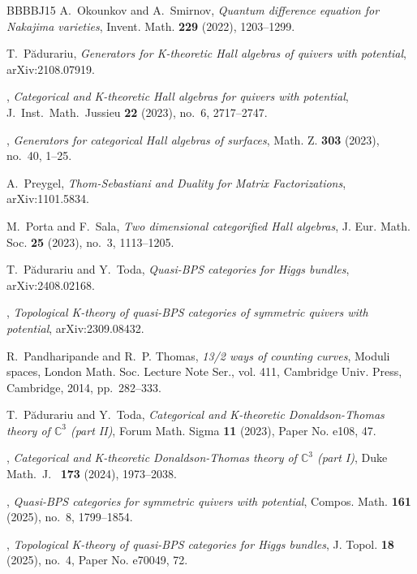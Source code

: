\documentclass [11pt,oneside,a4paper,mathscr]{amsart}
\theoremstyle{definition}
\begin{document}
\begin{thebibliography}{BBBBJ15}
A.~Okounkov and A.~Smirnov, \emph{Quantum difference equation for {N}akajima varieties}, Invent. Math. \textbf{229} (2022), 1203--1299.

T.~P{\u{a}}durariu, \emph{Generators for {K}-theoretic {H}all algebras of quivers with potential}, arXiv:2108.07919.

\bysame, \emph{Categorical and {K}-theoretic {H}all algebras for quivers with potential}, J.~Inst.~Math.~Jussieu \textbf{22} (2023), no.~6, 2717--2747.

\bysame, \emph{Generators for categorical {H}all algebras of surfaces}, Math. Z. \textbf{303} (2023), no.~40, 1--25.

A.~Preygel, \emph{{T}hom-{S}ebastiani and {D}uality for {M}atrix {F}actorizations}, arXiv:1101.5834.

M.~Porta and F.~Sala, \emph{Two dimensional categorified {H}all algebras}, J. Eur. Math. Soc. \textbf{25} (2023), no.~3, 1113--1205.

T.~P\u{a}durariu and Y.~Toda, \emph{Quasi-{BPS} categories for {H}iggs bundles}, arXiv:2408.02168.

\bysame, \emph{Topological {K}-theory of quasi-{BPS} categories of symmetric quivers with potential}, arXiv:2309.08432.

R.~Pandharipande and R.~P. Thomas, \emph{13/2 ways of counting curves}, Moduli spaces, London Math. Soc. Lecture Note Ser., vol. 411, Cambridge Univ. Press, Cambridge, 2014, pp.~282--333.

T.~P\u{a}durariu and Y.~Toda, \emph{Categorical and {K}-theoretic {D}onaldson-{T}homas theory of $\mathbb{C}^3$ (part {II})}, Forum Math. Sigma \textbf{11} (2023), Paper No. e108, 47.

\bysame, \emph{Categorical and {K}-theoretic {D}onaldson-{T}homas theory of $\mathbb{C}^3$ (part {I})}, Duke Math.~J.~ \textbf{173} (2024), 1973--2038.

\bysame, \emph{Quasi-{BPS} categories for symmetric quivers with potential}, Compos. Math. \textbf{161} (2025), no.~8, 1799--1854.

\bysame, \emph{Topological {K}-theory of quasi-{BPS} categories for {H}iggs bundles}, J. Topol. \textbf{18} (2025), no.~4, Paper No. e70049, 72.


\end{thebibliography}
\end{document}
